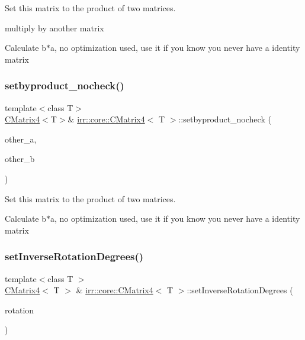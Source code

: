 Set this matrix to the product of two matrices. 

multiply by another matrix

Calculate b$\ast$a, no optimization used, use it if you know you never have a identity matrix \mbox{\label{classirr_1_1core_1_1CMatrix4_a65b8c0c066e1105b89fbbdb753ffabd8}} 
\subsubsection{\texorpdfstring{setbyproduct\+\_\+nocheck()}{setbyproduct\_nocheck()}\hspace{0.1cm}{\footnotesize\ttfamily [2/2]}}
{\footnotesize\ttfamily template$<$class T$>$ \\
\hyperlink{classirr_1_1core_1_1CMatrix4}{C\+Matrix4}$<$T$>$\& \hyperlink{classirr_1_1core_1_1CMatrix4}{irr\+::core\+::\+C\+Matrix4}$<$ T $>$\+::setbyproduct\+\_\+nocheck (\begin{DoxyParamCaption}\item[{const \hyperlink{classirr_1_1core_1_1CMatrix4}{C\+Matrix4}$<$ T $>$ \&}]{other\+\_\+a,  }\item[{const \hyperlink{classirr_1_1core_1_1CMatrix4}{C\+Matrix4}$<$ T $>$ \&}]{other\+\_\+b }\end{DoxyParamCaption})}



Set this matrix to the product of two matrices. 

Calculate b$\ast$a, no optimization used, use it if you know you never have a identity matrix \mbox{\label{classirr_1_1core_1_1CMatrix4_afd84b9c93b4c8e9dc2abefa4a28057f9}} 
\subsubsection{\texorpdfstring{set\+Inverse\+Rotation\+Degrees()}{setInverseRotationDegrees()}\hspace{0.1cm}{\footnotesize\ttfamily [1/2]}}
{\footnotesize\ttfamily template$<$class T $>$ \\
\hyperlink{classirr_1_1core_1_1CMatrix4}{C\+Matrix4}$<$ T $>$ \& \hyperlink{classirr_1_1core_1_1CMatrix4}{irr\+::core\+::\+C\+Matrix4}$<$ T $>$\+::set\+Inverse\+Rotation\+Degrees (\begin{DoxyParamCaption}\item[{const \hyperlink{classirr_1_1core_1_1vector3d}{vector3d}$<$ T $>$ \&}]{rotation }\end{DoxyParamCaption})\hspace{0.3cm}{\ttfamily [inline]}}



